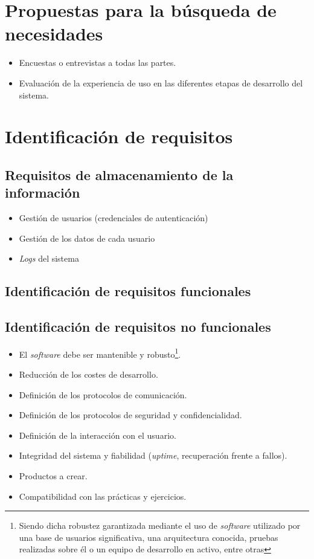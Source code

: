 \section{Propuestas para la búsqueda de necesidades}

\begin{itemize}
  \item Encuestas o entrevistas a todas las partes.
  \item Evaluación de la experiencia de uso en las diferentes etapas de desarrollo del sistema.
\end{itemize}

\section{Identificación de requisitos}

\subsection{Requisitos de almacenamiento de la información}

\begin{itemize}
  \item Gestión de usuarios (credenciales de autenticación)
  \item Gestión de los datos de cada usuario
  \item \textit{Logs} del sistema
\end{itemize}

\subsection{Identificación de requisitos funcionales}


\subsection{Identificación de requisitos no funcionales}

\begin{itemize}
  \item El \textit{software} debe ser mantenible y robusto\footnote{Siendo dicha robustez garantizada mediante el uso de \textit{software} utilizado por una base de usuarios significativa, una arquitectura conocida, pruebas realizadas sobre él o un equipo de desarrollo en activo, entre otras}.
  \item Reducción de los costes de desarrollo.
  \item Definición de los protocolos de comunicación.
  \item Definición de los protocolos de seguridad y confidencialidad.
  \item Definición de la interacción con el usuario.
  \item Integridad del sistema y fiabilidad (\textit{uptime}, recuperación frente a fallos).
  \item Productos a crear.
  \item Compatibilidad con las prácticas y ejercicios.
\end{itemize}

